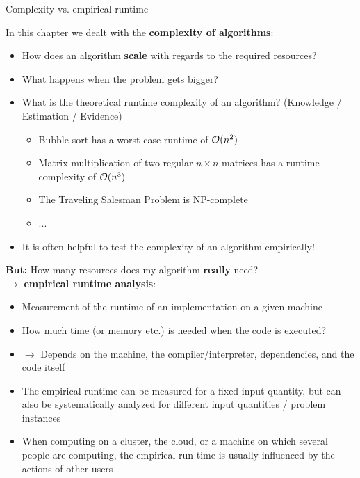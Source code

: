 \begin{vbframe}{Complexity vs. empirical runtime}

In this chapter we dealt with the \textbf{complexity of algorithms}:

\begin{itemize}
\item How does an algorithm \textbf{scale} with regards to the required resources?
\item What happens when the problem gets bigger?
\item What is the theoretical runtime complexity of an algorithm? (Knowledge / Estimation / Evidence)
\begin{itemize}
\item Bubble sort has a worst-case runtime of $\mathcal{O}(n^2)$
\item Matrix multiplication of two regular $n\times n$ matrices has a runtime complexity of $\mathcal{O}(n^3)$
\item The Traveling Salesman Problem is NP-complete
\item ...
\end{itemize}
\item It is often helpful to test the complexity of an algorithm empirically!
\end{itemize}

\framebreak

\textbf{But:} How many resources does my algorithm \textbf{really} need?\\
$\to$ \textbf{empirical runtime analysis}:

\begin{itemize}
\item Measurement of the runtime of an implementation on a given machine
\item How much time (or memory etc.) is needed when the code is executed?
\item $\to$ Depends on the machine, the compiler/interpreter, dependencies, and the code itself
\item The empirical runtime can be measured for a fixed input quantity, but can also be systematically analyzed for different input quantities / problem instances
\item When computing on a cluster, the cloud, or a machine on which several people are computing, the empirical run-time is usually influenced by the actions of other users
\end{itemize}

\end{vbframe}

\endlecture


